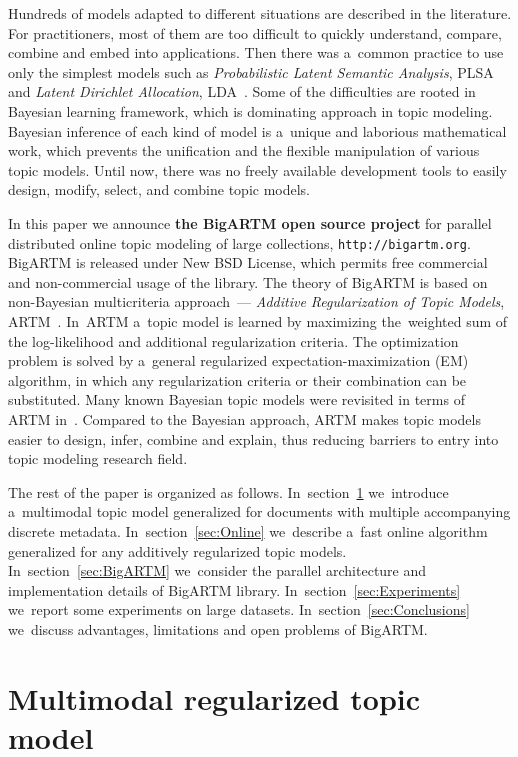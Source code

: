 \documentclass{llncs}
\begin{document}
Hundreds of models adapted to different situations are described in the literature.
For practitioners, most of them are too difficult to quickly
understand, compare, combine and embed into applications.
Then there was a~common practice to use only the simplest models such as
\emph{Probabilistic Latent Semantic Analysis}, PLSA~\cite{hofmann99plsi} and
\emph{Latent Dirichlet Allocation}, LDA~\cite{blei03latent}.
Some of the difficulties are rooted in Bayesian learning framework,
which is dominating approach in topic modeling.
Bayesian inference of each kind of model is a~unique and laborious mathematical work,
which prevents the unification and the flexible manipulation of various topic models.
Until now, there was no freely available development tools
to easily design, modify, select, and combine topic models.

In this paper we announce \textbf{the BigARTM open source project} for
parallel distributed online topic modeling of large collections,
\texttt{http://bigartm.org}.
BigARTM is released under New BSD License, which permits free commercial and non-commercial usage of the library.
The theory of BigARTM is based on non-Bayesian multicriteria approach~---
\emph{Additive Regularization of Topic Models}, ARTM~\cite{voron14dan-eng}.
In~ARTM a~topic model is learned by maximizing the~weighted sum
of the log-likelihood and additional regularization criteria.
The optimization problem is solved by a~general regularized expectation-maximization (EM) algorithm,
in which any regularization criteria or their combination can be substituted.
Many known Bayesian topic models were revisited in terms of ARTM in~\cite{voron14aist,voron14mlj}.
Compared to the Bayesian approach,
ARTM makes topic models easier to design, infer, combine and explain,
thus reducing barriers to entry into topic modeling research field.

The rest of the paper is organized as follows.
In~section~\ref{sec:Multimodal}
we~introduce a~multimodal topic model generalized for documents with multiple accompanying discrete metadata.
In~section~\ref{sec:Online}
we~describe a~fast online algorithm~\cite{hoffman10online} generalized for any additively regularized topic models.
In~section~\ref{sec:BigARTM}
we~consider the parallel architecture and implementation details of BigARTM library.
In~section~\ref{sec:Experiments}
we~report some experiments on large datasets.
In~section~\ref{sec:Conclusions}
we~discuss advantages, limitations and open problems of BigARTM.


\section{Multimodal regularized topic model}
\label{sec:Multimodal}
\end{document}
